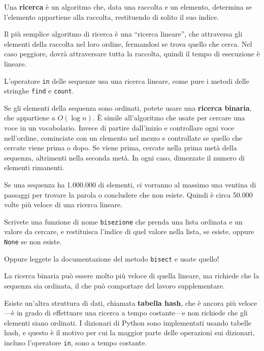 \documentclass[10pt]{book}
\begin{document}
Una {\bf ricerca} è un algoritmo che, data una raccolta e un elemento, determina se l'elemento appartiene alla raccolta, restituendo di solito il suo indice.

Il più semplice algoritmo di ricerca è una ``ricerca lineare'', che attraversa gli elementi della raccolta nel loro ordine, fermandosi se trova quello che cerca. Nel caso peggiore, dovrà attraversare tutta la raccolta, quindi il tempo di esecuzione è lineare.

L'operatore {\tt in} delle sequenze usa una ricerca lineare, come pure i metodi delle stringhe {\tt find} e {\tt count}.

Se gli elementi della sequenza sono ordinati, potete usare una {\bf ricerca binaria}, che appartiene a $O(\log n)$.  È simile all'algoritmo che usate per cercare una voce in un vocabolario. Invece di partire dall'inizio e controllare ogni voce nell'ordine, cominciate con un elemento nel mezzo e controllate se quello che cercate viene prima o dopo. Se viene prima, cercate nella prima metà della sequenza, altrimenti nella seconda metà. In ogni caso, dimezzate il numero di elementi rimanenti.

Se una sequenza ha 1.000.000 di elementi, ci vorranno al massimo una ventina di passaggi per trovare la parola o concludere che non esiste. Quindi è circa 50.000 volte più veloce di una ricerca lineare.

\vspace{0.2in}
\begin{exercise}

Scrivete una funzione di nome {\tt bisezione} che prenda una lista ordinata e un valore da cercare, e restituisca l'indice di quel valore nella lista, se esiste, oppure {\tt None} se non esiste.


Oppure leggete la documentazione del metodo {\tt bisect} e usate quello!

\end{exercise}

La ricerca binaria può essere molto più veloce di quella lineare, ma richiede che la sequenza sia ordinata, il che può comportare del lavoro supplementare.

Esiste un'altra struttura di dati, chiamata {\bf tabella hash}, che è ancora più veloce---è in grado di effettuare una ricerca a tempo costante---e non richiede che gli elementi siano ordinati. I dizionari di Python sono implementati usando tabelle hash, e questo è il motivo per cui la maggior parte delle operazioni sui dizionari, incluso l'operatore {\tt in}, sono a tempo costante.
\end{document}
